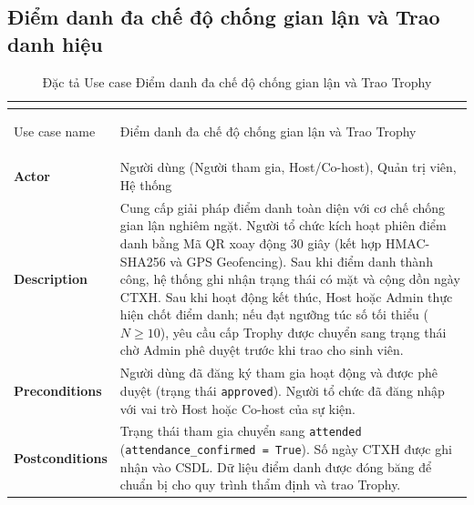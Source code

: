 \subsection{Điểm danh đa chế độ chống gian lận và Trao danh hiệu}

\renewcommand{\arraystretch}{1.5}
\begin{xltabular}{\textwidth}{|>{\bfseries}p{3.5cm}|X|}
    \caption{Đặc tả Use case Điểm danh đa chế độ chống gian lận và Trao Trophy} \label{tab:uc_diemdanh} \\
    \hline
    \endfirsthead
    \caption[]{Đặc tả Use case Điểm danh đa chế độ chống gian lận và Trao Trophy} \\
    \hline
    \endhead
    \hline
    \endfoot
    \hline
    \endlastfoot

    Use case name & Điểm danh đa chế độ chống gian lận và Trao Trophy \\ \hline
    Actor & Người dùng (Người tham gia, Host/Co-host), Quản trị viên, Hệ thống \\ \hline
    Description & Cung cấp giải pháp điểm danh toàn diện với cơ chế chống gian lận nghiêm ngặt. Người tổ chức kích hoạt phiên điểm danh bằng Mã QR xoay động 30 giây (kết hợp HMAC-SHA256 và GPS Geofencing). Sau khi điểm danh thành công, hệ thống ghi nhận trạng thái có mặt và cộng dồn ngày CTXH. Sau khi hoạt động kết thúc, Host hoặc Admin thực hiện chốt điểm danh; nếu đạt ngưỡng túc số tối thiểu ($N \ge 10$), yêu cầu cấp Trophy được chuyển sang trạng thái chờ Admin phê duyệt trước khi trao cho sinh viên. \\ \hline
    Preconditions & Người dùng đã đăng ký tham gia hoạt động và được phê duyệt (trạng thái \texttt{approved}). Người tổ chức đã đăng nhập với vai trò Host hoặc Co-host của sự kiện. \\ \hline
    Postconditions & Trạng thái tham gia chuyển sang \texttt{attended} (\texttt{attendance\_confirmed = True}). Số ngày CTXH được ghi nhận vào CSDL. Dữ liệu điểm danh được đóng băng để chuẩn bị cho quy trình thẩm định và trao Trophy. \\ \hline
    

\end{xltabular}
